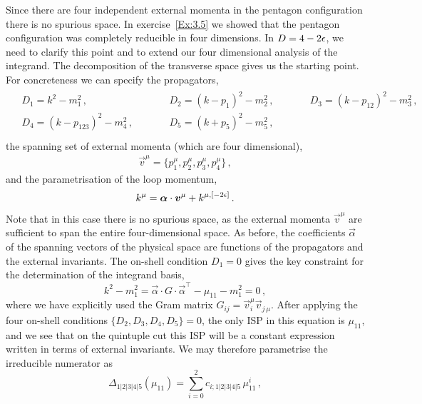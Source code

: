 Since there are four independent external momenta in the pentagon configuration
there is no spurious space. In exercise~\ref{Ex:3.5} we showed that the pentagon
configuration was completely reducible in four dimensions. In $D=4-2\epsilon$, we
need to clarify this point and to extend our four dimensional analysis of the
integrand. The decomposition of the transverse space gives us the starting
point. For concreteness we can specify the propagators,
\begin{align}
\begin{alignedat}{3}
& D_1 = k^2-m_1^2\,, && D_2 = (k-p_1)^2 - m_2^2\,, \qquad && D_3 = (k-p_{12})^2 - m_3^2 \,, \\
& D_4 = (k-p_{123})^2 - m_4^2\,, \qquad && D_5 = (k+p_5)^2 - m_5^2\,, && \\
\end{alignedat}
\label{eq:boxprops}
\end{align}
the spanning set of external momenta (which are four dimensional),
\begin{align}
\vec{v}^{\mu} = \{ p_1^{\mu}, p_2^{\mu}, p_3^{\mu}, p_4^{\mu} \} \,,
\end{align}
and the parametrisation of the loop momentum,
\begin{equation}
  k^\mu = \vec{\alpha}\cdot \vec{v}^\mu + k^{\mu, [-2\eps]} \,.
\end{equation}
Note that in this case there is no spurious space, as the external momenta $\vec{v}^{\mu}$ are sufficient to span the entire four-dimensional space.
As before, the coefficients $\vec{\alpha}$ of the spanning vectors of the physical
space are functions of the propagators and the external invariants. The
on-shell condition $D_1=0$ gives the key constraint for the determination of
the integrand basis,
\begin{equation}
  k^2 - m_1^2 = \vec{\alpha}\cdot G \cdot \vec{\alpha}^{\top} - \mu_{11} -m_1^2 = 0 \,,
  \label{eq:pentmucondition}
\end{equation}
where we have explicitly used the Gram matrix $G_{ij} = \vec{v}_i^{\mu}
\vec{v}_{j\,\mu}$. After applying the four on-shell conditions
$\{D_2,D_3,D_4,D_5\}=0$, the only ISP in this equation is $\mu_{11}$, and we
see that on the quintuple cut this ISP will be a constant expression written in
terms of external invariants. We may therefore parametrise the irreducible
numerator as
\begin{equation}
  \Delta_{1|2|3|4|5}(\mu_{11}) = \sum_{i=0}^2 c_{i;1|2|3|4|5} \, \mu_{11}^i \,,
\end{equation}
